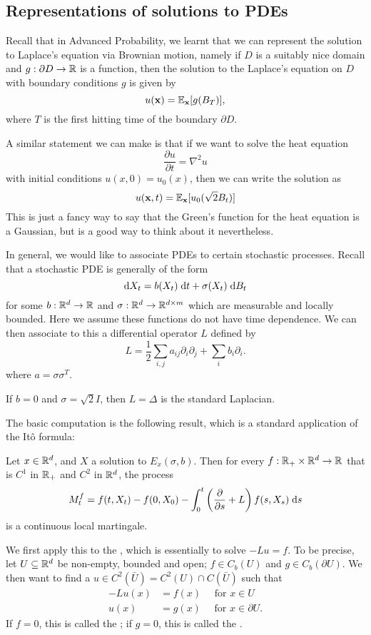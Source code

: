 \documentclass[a4paper]{article}
\begin{document}
\subsection{Representations of solutions to PDEs}
Recall that in Advanced Probability, we learnt that we can represent the solution to Laplace's equation via Brownian motion, namely if $D$ is a suitably nice domain and $g: \partial D \to \mathbb{R}$ is a function, then the solution to the Laplace's equation on $D$ with boundary conditions $g$ is given by
\[
  u(\mathbf{x}) = \mathbb{E}_{\mathbf{x}}[g(B_T)],
\]
where $T$ is the first hitting time of the boundary $\partial D$.

A similar statement we can make is that if we want to solve the heat equation
\[
  \frac{\partial u}{\partial t} = \nabla^2 u
\]
with initial conditions $u(x, 0) = u_0(x)$, then we can write the solution as
\[
  u(\mathbf{x}, t) = \mathbb{E}_\mathbf{x}[u_0(\sqrt{2} B_t)]
\]
This is just a fancy way to say that the Green's function for the heat equation is a Gaussian, but is a good way to think about it nevertheless.

In general, we would like to associate PDEs to certain stochastic processes. Recall that a stochastic PDE is generally of the form
\[
  \mathrm{d} X_t = b(X_t)\;\mathrm{d} t + \sigma(X_t)\;\mathrm{d} B_t
\]
for some $b: \mathbb{R}^d \to \mathbb{R}$ and $\sigma: \mathbb{R}^d \to \mathbb{R}^{d \times m}$ which are measurable and locally bounded. Here we assume these functions do not have time dependence. We can then associate to this a differential operator $L$ defined by
\[
  L = \frac{1}{2} \sum_{i, j} a_{ij} \partial_i \partial_j + \sum_i b_i \partial_i.
\]
where $a = \sigma \sigma^T$.

\begin{eg}
  If $b = 0$ and $\sigma = \sqrt{2} I$, then $L = \Delta$ is the standard Laplacian.
\end{eg}

The basic computation is the following result, which is a standard application of the It\^o formula:
\begin{prop}
  Let $x \in \mathbb{R}^d$, and $X$ a solution to $E_x(\sigma, b)$. Then for every $f: \mathbb{R}_+ \times \mathbb{R}^d \to \mathbb{R}$ that is $C^1$ in $\mathbb{R}_+$ and $C^2$ in $\mathbb{R}^d$, the process
  \[
    M_t^f = f(t, X_t) - f(0, X_0) - \int_0^t \left(\frac{\partial}{\partial s} + L\right)f(s, X_s)\;\mathrm{d} s
  \]
  is a continuous local martingale.\fakeqed
\end{prop}

We first apply this to the , which is essentially to solve $-Lu = f$. To be precise, let $U \subseteq \mathbb{R}^d$ be non-empty, bounded and open; $f \in C_b(U)$ and $g \in C_b(\partial U)$. We then want to find a $u \in C^2(\bar{U}) = C^2(U) \cap C(\bar{U})$ such that
\begin{align*}
  -Lu(x) &= f(x)\quad\text{ for } x \in U\\
  u(x) &= g(x)\quad\text{ for } x \in \partial U.
\end{align*}
If $f = 0$, this is called the ; if $g = 0$, this is called the .
\end{document}
